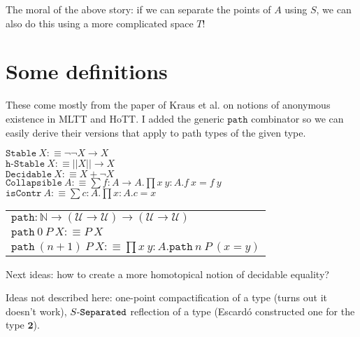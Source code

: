 \documentclass[11pt]{article}
\theoremstyle{definition}
\newcommand{\txt}[1]{\texttt{#1}}
\newcommand{\text}[1]{\texttt{#1}}
\renewcommand{\(}{\left(}
\renewcommand{\)}{\right)}
\newcommand{\defn}{:\equiv}
\newcommand{\U}{\mathcal{U}}
\newcommand{\isContr}{\text{isContr}}
\newcommand{\apl}[2]{#1\ #2}
\newcommand{\Bool}{\mathbf{2}}
\newcommand{\Nat}{\mathbb{N}}
\newcommand{\dprod}[2]{\prod #1.#2}
\newcommand{\dsum}[2]{\sum #1.#2}
\newcommand{\trf}[1]{||#1||}
\begin{document}
The moral of the above story: if we can separate the points of $A$ using $S$, we can also do this using a more complicated space $T$!

\section{Some definitions}

\newcommand{\Stable}{\txt{Stable}}
\newcommand{\nStable}[1]{#1$-$\txt{Stable}}

\newcommand{\Decidable}{\txt{Decidable}}
\newcommand{\nDecidable}[1]{#1$-$\txt{Decidable}}

\newcommand{\hStable}{\txt{h}$-$\txt{Stable}}
\newcommand{\nhStable}[1]{#1$-$\txt{hStable}}

\newcommand{\Collapsible}{\txt{Collapsible}}
\newcommand{\nCollapsible}[1]{#1$-$\txt{Collapsible}}

\newcommand{\path}{\txt{path}}

These come mostly from the paper of Kraus et al. on notions of anonymous existence in MLTT and HoTT. I added the generic $\path$ combinator so we can easily derive their versions that apply to path types of the given type.

$\apl{\Stable}{X} \defn \neg\neg X \to X$ \\

$\apl{\hStable}{X} \defn \trf{X} \to X$ \\

$\apl{\Decidable}{X} \defn X + \neg X$ \\

$\apl{\Collapsible}{A} \defn \dsum{f : A \to A}{\dprod{x\ y : A}{\apl{f}{x} = \apl{f}{y}}}$ \\

$\apl{\isContr}{A} \defn \dsum{c : A}{\dprod{x : A}{c = x}}$

\begin{center}
\begin{tabular}{l}
$\path : \Nat \to (\U \to \U) \to (\U \to \U)$ \\
$\path\ 0\ P\ X \defn \apl{P}{X}$ \\
$\path\ (n + 1)\ P\ X \defn \dprod{x\ y : A}{\path\ n\ P\ (x = y)}$
\end{tabular}
\end{center}

Next ideas: how to create a more homotopical notion of decidable equality?

Ideas not described here: one-point compactification of a type (turns out it doesn't work), $\Separated{S}$ reflection of a type (Escard\'{o} constructed one for the type $\Bool$).
\end{document}
